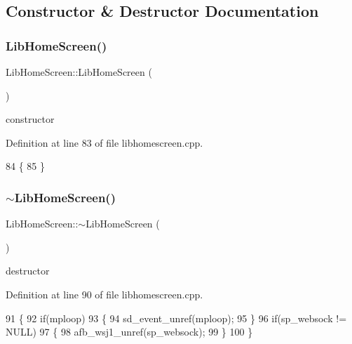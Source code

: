 \subsection{Constructor \& Destructor Documentation}
\mbox{\label{class_lib_home_screen_a724bd949c4154fad041f96a15ef0f5dc}} 
\subsubsection{\texorpdfstring{Lib\+Home\+Screen()}{LibHomeScreen()}\hspace{0.1cm}{\footnotesize\ttfamily [1/2]}}
{\footnotesize\ttfamily Lib\+Home\+Screen\+::\+Lib\+Home\+Screen (\begin{DoxyParamCaption}{ }\end{DoxyParamCaption})}

constructor 

Definition at line 83 of file libhomescreen.\+cpp.


\begin{DoxyCode}
84 \{
85 \}
\end{DoxyCode}
\mbox{\label{class_lib_home_screen_a249902aebf71a5383ca8ec6ae558d095}} 
\subsubsection{\texorpdfstring{$\sim$\+Lib\+Home\+Screen()}{~LibHomeScreen()}}
{\footnotesize\ttfamily Lib\+Home\+Screen\+::$\sim$\+Lib\+Home\+Screen (\begin{DoxyParamCaption}{ }\end{DoxyParamCaption})}

destructor 

Definition at line 90 of file libhomescreen.\+cpp.


\begin{DoxyCode}
91 \{
92     \textcolor{keywordflow}{if}(mploop)
93     \{
94         sd\_event\_unref(mploop);
95     \}
96     \textcolor{keywordflow}{if}(sp\_websock != NULL)
97     \{
98         afb\_wsj1\_unref(sp\_websock);
99     \}
100 \}
\end{DoxyCode}
\mbox{\label{class_lib_home_screen_a0fff2f703c8ce184eb9edd133e0f4137}} 
